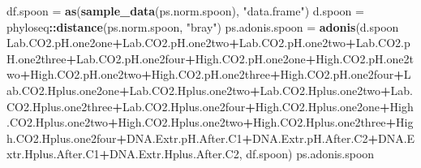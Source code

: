 \documentclass[]{article}
\newenvironment{Shaded}{\begin{snugshade}}{\end{snugshade}}
\newcommand{\KeywordTok}[1]{\textcolor[rgb]{0.13,0.29,0.53}{\textbf{#1}}}
\newcommand{\NormalTok}[1]{#1}
\newcommand{\OperatorTok}[1]{\textcolor[rgb]{0.81,0.36,0.00}{\textbf{#1}}}
\newcommand{\StringTok}[1]{\textcolor[rgb]{0.31,0.60,0.02}{#1}}
\begin{document}
\begin{Shaded}
\begin{Highlighting}[]
\NormalTok{df.spoon =}\StringTok{ }\KeywordTok{as}\NormalTok{(}\KeywordTok{sample_data}\NormalTok{(ps.norm.spoon), }\StringTok{"data.frame"}\NormalTok{)}
\NormalTok{d.spoon =}\StringTok{ }\NormalTok{phyloseq}\OperatorTok{::}\KeywordTok{distance}\NormalTok{(ps.norm.spoon, }\StringTok{"bray"}\NormalTok{) }
\NormalTok{ps.adonis.spoon =}\StringTok{ }\KeywordTok{adonis}\NormalTok{(d.spoon }\OperatorTok{~}\StringTok{ }\NormalTok{Lab.CO2.pH.one2one}\OperatorTok{+}\NormalTok{Lab.CO2.pH.one2two}\OperatorTok{+}\NormalTok{Lab.CO2.pH.one2two}\OperatorTok{+}\NormalTok{Lab.CO2.pH.one2three}\OperatorTok{+}\NormalTok{Lab.CO2.pH.one2four}\OperatorTok{+}\NormalTok{High.CO2.pH.one2one}\OperatorTok{+}\NormalTok{High.CO2.pH.one2two}\OperatorTok{+}\NormalTok{High.CO2.pH.one2two}\OperatorTok{+}\NormalTok{High.CO2.pH.one2three}\OperatorTok{+}\NormalTok{High.CO2.pH.one2four}\OperatorTok{+}\NormalTok{Lab.CO2.Hplus.one2one}\OperatorTok{+}\NormalTok{Lab.CO2.Hplus.one2two}\OperatorTok{+}\NormalTok{Lab.CO2.Hplus.one2two}\OperatorTok{+}\NormalTok{Lab.CO2.Hplus.one2three}\OperatorTok{+}\NormalTok{Lab.CO2.Hplus.one2four}\OperatorTok{+}\NormalTok{High.CO2.Hplus.one2one}\OperatorTok{+}\NormalTok{High.CO2.Hplus.one2two}\OperatorTok{+}\NormalTok{High.CO2.Hplus.one2two}\OperatorTok{+}\NormalTok{High.CO2.Hplus.one2three}\OperatorTok{+}\NormalTok{High.CO2.Hplus.one2four}\OperatorTok{+}\NormalTok{DNA.Extr.pH.After.C1}\OperatorTok{+}\NormalTok{DNA.Extr.pH.After.C2}\OperatorTok{+}\NormalTok{DNA.Extr.Hplus.After.C1}\OperatorTok{+}\NormalTok{DNA.Extr.Hplus.After.C2, df.spoon)}
\NormalTok{ps.adonis.spoon}
\end{Highlighting}
\end{Shaded}
\end{document}
